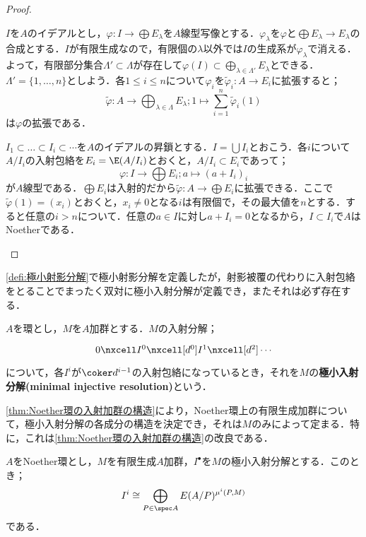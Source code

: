 \begin{proof}
	\begin{eqv}
		\item $I$を$A$のイデアルとし，$\varphi:I\to\bigoplus E_\lambda$を$A$線型写像とする．$\varphi_\lambda$を$\varphi$と$\bigoplus E_\lambda\to E_\lambda$の合成とする．$I$が有限生成なので，有限個の$\lambda$以外では$I$の生成系が$\varphi_\lambda$で消える．よって，有限部分集合$\Lambda'\subset\Lambda$が存在して$\varphi(I)\subset\bigoplus_{\lambda\in\Lambda'}E_\lambda$とできる．$\Lambda'=\{1,\dots,n\}$としよう．各$1\leq i\leq n$について$\varphi_i$を$\widetilde{\varphi}_i:A\to E_i$に拡張すると；
		\[\widetilde{\varphi}:A\to\bigoplus_{\lambda\in\Lambda}E_\lambda;1\mapsto\sum_{i=1}^n\widetilde{\varphi}_i(1)\]
		は$\varphi$の拡張である．
		\item $I_1\subset\dots\subset I_i\subset\cdots$を$A$のイデアルの昇鎖とする．$I=\bigcup I_i$とおこう．各$i$について$A/I_i$の入射包絡を$E_i=\E(A/I_i)$とおくと，$A/I_i\subset E_i$であって；
		\[\varphi:I\to\bigoplus E_i;a\mapsto (a+I_i)_i\]
		が$A$線型である．$\bigoplus E_i$は入射的だから$\widetilde{\varphi}:A\to\bigoplus E_i$に拡張できる．ここで$\widetilde{\varphi}(1)=(x_i)$とおくと，$x_i\neq0$となる$i$は有限個で，その最大値を$n$とする．すると任意の$i>n$について．任意の$a\in I$に対し$a+I_i=0$となるから，$I\subset I_i$で$A$はNoetherである．
	\end{eqv}
\end{proof}

\ref{defi:極小射影分解}で極小射影分解を定義したが，射影被覆の代わりに入射包絡をとることでまったく双対に極小入射分解が定義でき，またそれは必ず存在する．

\begin{defi}[極小入射分解]
	$A$を環とし，$M$を$A$加群とする．$M$の入射分解；
	\[\begin{tikzcd}
	0\nxcell I^0\nxcell[d^0]I^1\nxcell[d^2]\cdots
	\end{tikzcd}\]
	について，各$I^i$が$\coker d^{i-1}$の入射包絡になっているとき，それを$M$の\textbf{極小入射分解(minimal injective resolution)}という．
\end{defi}

\ref{thm:Noether環の入射加群の構造}により，Noether環上の有限生成加群について，極小入射分解の各成分の構造を決定でき，それは$M$のみによって定まる．特に，これは\ref{thm:Noether環の入射加群の構造}の改良である．

\begin{thm}[極小入射分解の構造定理]
	$A$をNoether環とし，$M$を有限生成$A$加群，$I^\bullet$を$M$の極小入射分解とする．このとき；
	\[I^i\cong\bigoplus_{P\in\spec A}E(A/P)^{\mu^i(P,M)}\]
	である．
\end{thm}

